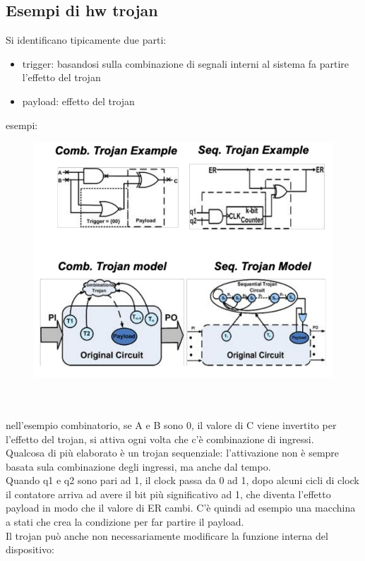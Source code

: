 \documentclass[oneside, 12pt]{extbook}
\begin{document}
\subsection{Esempi di hw trojan}
Si identificano tipicamente due parti:
\begin{itemize}
	\item trigger: basandosi sulla combinazione di segnali interni al sistema fa partire l'effetto del trojan
	\item payload: effetto del trojan
\end{itemize}
esempi:\\
\begin{figure}[!h]
	\includegraphics[scale=0.3]{immagini/hardware/hw_trojan.png}
\end{figure}
\\\\nell'esempio combinatorio, se A e B sono 0, il valore di C viene invertito per l'effetto del trojan, si attiva ogni volta che c'è combinazione di ingressi.
\\Qualcosa di più elaborato è un trojan sequenziale: l'attivazione non è sempre basata sula combinazione degli ingressi, ma anche dal tempo.
\\Quando q1 e q2 sono pari ad 1, il clock passa da 0 ad 1, dopo alcuni cicli di clock il contatore arriva ad avere il bit più significativo ad 1, che diventa l'effetto payload in modo che il valore di ER cambi. C'è quindi ad esempio una macchina a stati che crea la condizione per far partire il payload.
\\Il trojan può anche non necessariamente modificare la funzione interna del dispositivo:\\
\end{document}
